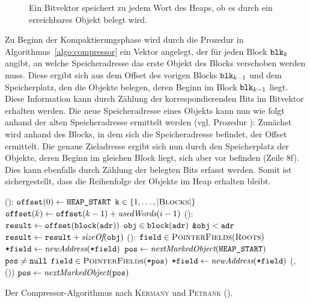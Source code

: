 \begin{figure}[h]
	\centering
	
	\caption[Bitvektor]{Ein Bitvektor speichert zu jedem Wort des Heaps, ob es durch ein erreichbares Objekt belegt wird.}
	\label{fig:bitvector}
\end{figure}

Zu Beginn der Kompaktierungsphase wird durch die Prozedur  in Algorithmus~\ref{algo:compressor} ein Vektor  angelegt, der für jeden Block $\texttt{blk}_k$ angibt, an welche Speicheradresse das erste Objekt des Blocks verschoben werden muss.
Diese ergibt sich aus dem Offset des vorigen Blocks $\texttt{blk}_{k-1}$ und dem Speicherplatz, den die Objekte belegen, deren Beginn im Block $\texttt{blk}_{k-1}$ liegt.
Diese Information kann durch Zählung der korrespondierenden Bits im Bitvektor erhalten werden.
Die neue Speicheradresse eines Objekts kann nun wie folgt anhand der alten Speicheradresse  ermittelt werden (vgl. Prozedur ):
Zunächst wird anhand des Blocks, in dem sich die Speicheradresse befindet, der Offset ermittelt.
Die genaue Zieladresse ergibt sich nun durch den Speicherplatz der Objekte, deren Beginn im gleichen Block liegt, sich aber vor  befinden (Zeile 8f).
Dies kann ebenfalls durch Zählung der belegten Bits erfasst werden.
Somit ist sichergestellt, dass die Reihenfolge der Objekte im Heap erhalten bleibt.

\begin{algorithm}[h]
\begin{algorithmic}[1]
	\State {}():
	\State \quad $\texttt{offset}(0) \gets \texttt{HEAP\_START}$
	\State \quad \FOR $\texttt{k} \in \{1, \dots, \left\lvert\textsc{Blocks}\right\rvert\}$
	\State \quad \quad $\texttt{offset}(k) \gets \texttt{offset}(k-1) + \textit{usedWords}(i-1)$
	\Statex
	\State {}():
	\State \quad $\texttt{result} \gets \texttt{offset}(\texttt{block}(\texttt{adr}))$	
	\State \quad \FOREACH $\texttt{obj} \in \texttt{block}(\texttt{adr})$
	\State \quad \quad \IF $\texttt{\&obj} < \texttt{adr}$	
	\State \quad \quad \quad $\texttt{result} \gets \texttt{result} + \textit{sizeOf}(\texttt{obj})$
	\State \quad \Return {}
	\Statex
	\State {}():
	\State \quad \FOREACH $\texttt{field} \in \textsc{PointerFields}(\textsc{Roots})$
	\State \quad \quad $\texttt{*field} \gets \textit{newAddress}(\texttt{*field})$
	\State \quad $\texttt{pos} \gets \textit{nextMarkedObject}(\texttt{HEAP\_START})$
	\State \quad \WHILE $\texttt{pos} \neq \texttt{null}$	
	\State \quad \quad \FOREACH $\texttt{field} \in \textsc{PointerFields}(\texttt{*pos})$
	\State \quad \quad \quad $\texttt{*field} \gets \textit{newAddress}(\texttt{*field})$
	\State \quad \quad {}(, ())
	\State \quad \quad $\texttt{pos} \gets \textit{nextMarkedObject}(\texttt{pos})$
\end{algorithmic}
\caption[Compressor-Algorithmus]{Der Compressor-Algorithmus nach \textsc{Kermany} und \textsc{Petrank} (\cite{kermany2006}).}
\label{algo:compressor}
\end{algorithm}

